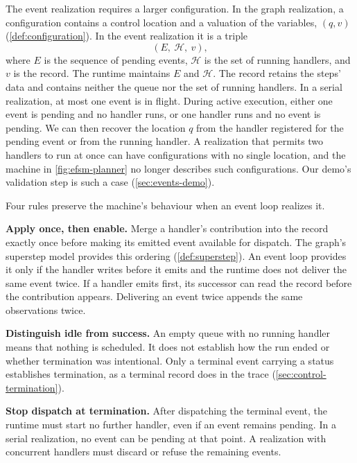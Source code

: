 The event realization requires a larger configuration. In the graph realization, a configuration
contains a control location and a valuation of the variables, $(q, v)$ (\cref{def:configuration}).
In the event realization it is a triple
\[
  (E,\ \mathcal{H},\ v),
\]
where $E$ is the sequence of pending events, $\mathcal{H}$ is the set of running handlers, and $v$
is the record. The runtime maintains $E$ and $\mathcal{H}$. The record retains the steps' data and
contains neither the queue nor the set of running handlers. In a serial realization, at most one
event is in flight. During active execution, either one event is pending and no handler runs, or
one handler runs and no event is pending. We can then recover the location $q$ from the handler
registered for the pending event or from the running handler. A realization that permits two
handlers to run at once can have configurations with no single location, and the machine in
\cref{fig:efsm-planner} no longer describes such configurations. Our demo's validation step is
such a case (\cref{sec:events-demo}).

Four rules preserve the machine's behaviour when an event loop realizes it.

\bi

\item \textbf{Apply once, then enable.} Merge a handler's contribution into the record exactly
once before making its emitted event available for dispatch. The graph's superstep model provides
this ordering (\cref{def:superstep}). An event loop provides it only if the handler writes before
it emits and the runtime does not deliver the same event twice. If a handler emits first, its successor can
read the record before the contribution appears. Delivering an event twice appends the same
observations twice.

\item \textbf{Distinguish idle from success.} An empty queue with no running handler means that
nothing is scheduled. It does not establish how the run ended or whether termination was
intentional. Only a terminal event carrying a status establishes termination, as a terminal record
does in the trace (\cref{sec:control-termination}).

\item \textbf{Stop dispatch at termination.} After dispatching the terminal event, the runtime
must start no further handler, even if an event remains pending. In a serial realization, no event
can be pending at that point. A realization with concurrent handlers must discard or refuse
the remaining events.

